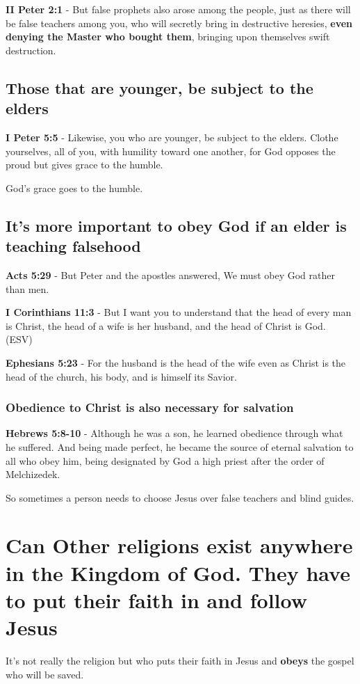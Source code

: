 \documentclass[11pt]{article}
\begin{document}
\textbf{II Peter 2:1} - But false prophets also arose among the people, just as there will be false teachers among you, who will secretly bring in destructive heresies, \textbf{even denying the Master who bought them}, bringing upon themselves swift destruction.

\subsection{Those that are younger, be subject to the elders}
\label{sec:orgef7e417}
\textbf{I Peter 5:5} - Likewise, you who are younger, be subject to the elders. Clothe yourselves, all of you, with humility toward one another, for God opposes the proud but gives grace to the humble.

God's grace goes to the humble.

\subsection{It's more important to obey God if an elder is teaching falsehood}
\label{sec:orgd6a3826}
\textbf{Acts 5:29} - But Peter and the apostles answered, We must obey God rather than men.

\textbf{I Corinthians 11:3} - But I want you to understand that the head of every man is Christ, the head of a wife is her husband, and the head of Christ is God. (ESV)

\textbf{Ephesians 5:23} - For the husband is the head of the wife even as Christ is the head of the church, his body, and is himself its Savior.

\subsubsection{Obedience to Christ is also necessary for salvation}
\label{sec:org31635fc}
\textbf{Hebrews 5:8-10} - Although he was a son, he learned obedience through what he suffered. And being made perfect, he became the source of eternal salvation to all who obey him, being designated by God a high priest after the order of Melchizedek.

So sometimes a person needs to choose Jesus over false teachers and blind guides.

\section{Can Other religions exist anywhere in the Kingdom of God. They have to put their faith in and follow Jesus}
\label{sec:org0ae8986}
It's not really the religion but who puts their faith in Jesus and \textbf{obeys} the gospel who will be saved.
\end{document}
